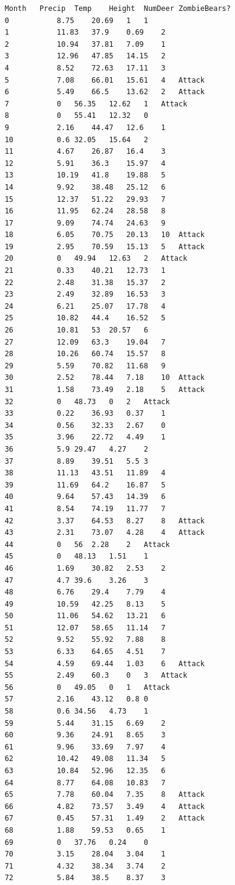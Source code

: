 \documentclass[11pt,letterpaper]{article}
\begin{document}
\begin{enumerate}
\begin{lstlisting}
    Month	Precip	Temp	Height	NumDeer	ZombieBears?
    0	        8.75	20.69	1	1	
    1	        11.83	37.9	0.69	2	
    2	        10.94	37.81	7.09	1	
    3	        12.96	47.85	14.15	2	
    4	        8.52	72.63	17.11	3	
    5	        7.08	66.01	15.61	4	Attack
    6	        5.49	66.5	13.62	2	Attack
    7	        0	56.35	12.62	1	Attack
    8	        0	55.41	12.32	0	
    9	        2.16	44.47	12.6	1	
    10	        0.6	32.05	15.64	2	
    11	        4.67	26.87	16.4	3	
    12	        5.91	36.3	15.97	4	
    13	        10.19	41.8	19.88	5	
    14	        9.92	38.48	25.12	6	
    15	        12.37	51.22	29.93	7	
    16	        11.95	62.24	28.58	8	
    17	        9.09	74.74	24.63	9	
    18	        6.05	70.75	20.13	10	Attack
    19	        2.95	70.59	15.13	5	Attack
    20	        0	49.94	12.63	2	Attack
    21	        0.33	40.21	12.73	1	
    22	        2.48	31.38	15.37	2	
    23	        2.49	32.89	16.53	3	
    24	        6.21	25.07	17.78	4	
    25	        10.82	44.4	16.52	5	
    26	        10.81	53	20.57	6	
    27	        12.09	63.3	19.04	7	
    28	        10.26	60.74	15.57	8	
    29	        5.59	70.82	11.68	9	
    30	        2.52	78.44	7.18	10	Attack
    31	        1.58	73.49	2.18	5	Attack
    32	        0	48.73	0	2	Attack
    33	        0.22	36.93	0.37	1	
    34	        0.56	32.33	2.67	0	
    35	        3.96	22.72	4.49	1	
    36	        5.9	29.47	4.27	2	
    37	        8.89	39.51	5.5	3	
    38	        11.13	43.51	11.89	4	
    39	        11.69	64.2	16.87	5	
    40	        9.64	57.43	14.39	6	
    41	        8.54	74.19	11.77	7	
    42	        3.37	64.53	8.27	8	Attack
    43	        2.31	73.07	4.28	4	Attack
    44	        0	56	2.28	2	Attack
    45	        0	48.13	1.51	1	
    46	        1.69	30.82	2.53	2	
    47	        4.7	39.6	3.26	3	
    48	        6.76	29.4	7.79	4	
    49	        10.59	42.25	8.13	5	
    50	        11.06	54.62	13.21	6	
    51	        12.07	58.65	11.14	7	
    52	        9.52	55.92	7.88	8	
    53	        6.33	64.65	4.51	7	
    54	        4.59	69.44	1.03	6	Attack
    55	        2.49	60.3	0	3	Attack
    56	        0	49.05	0	1	Attack  
    57	        2.16	43.12	0.8	0	
    58	        0.6	34.56	4.73	1	
    59	        5.44	31.15	6.69	2	
    60	        9.36	24.91	8.65	3	
    61	        9.96	33.69	7.97	4	
    62	        10.42	49.08	11.34	5	
    63	        10.84	52.96	12.35	6	
    64	        8.77	64.08	10.83	7	
    65	        7.78	60.04	7.35	8	Attack
    66	        4.82	73.57	3.49	4	Attack
    67	        0.45	57.31	1.49	2	Attack
    68	        1.88	59.53	0.65	1	
    69	        0	37.76	0.24	0	
    70	        3.15	28.04	3.04	1	
    71	        4.32	38.34	3.74	2	
    72	        5.84	38.5	8.37	3	


\end{lstlisting}
\end{enumerate}
\end{document}

